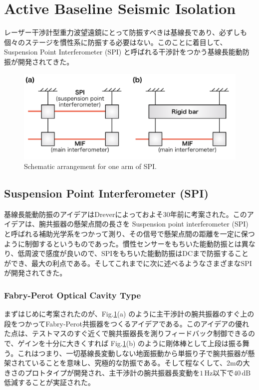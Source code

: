 \section{Active Baseline Seismic Isolation}
レーザー干渉計型重力波望遠鏡にとって防振すべきは基線長であり、必ずしも個々のステージを慣性系に防振する必要はない。このことに着目して、Suspension Point Interferometer (SPI) と呼ばれる干渉計をつかう基線長能動防振が開発されてきた。

\begin{figure}[H]
  \begin{center}   
    \includegraphics[width=13cm]{./img_chap5/img508.png}
    \caption{Schematic arrangement for one arm of SPI.} \label{img:img508}
  \end{center}
\end{figure}
\subsection{Suspension Point Interferometer (SPI)}
基線長能動防振のアイデアはDreverによっておよそ30年前に考案された。このアイデアは、腕共振器の懸架点間の長さを Suspension point interferometer (SPI) と呼ばれる補助光学系をつかって測り、その信号で懸架点間の距離を一定に保つように制御するというものであった\cite{drever1987outline}。慣性センサーをもちいた能動防振とは異なり、低周波で感度が良いので、SPIをもちいた能動防振はDCまで防振することができ、最大の利点である。そしてこれまでに次に述べるようなさまざまなSPIが開発されてきた。

\subsubsection{Fabry-Perot Optical Cavity Type }
まずはじめに考案されたのが、Fig.\ref{img:img508}(a) のように主干渉計の腕共振器のすぐ上の段をつかってFabry-Perot共振器をつくるアイデアである\cite{drever2002extension}。このアイデアの優れた点は、テストマスのすぐ近くで腕共振器長を測りフィードバック制御できるので、ゲインを十分に大きくすれば Fig.\ref{img:img508}(b) のように剛体棒として上段は振る舞う。これはつまり、一切基線長変動しない地面振動から単振り子で腕共振器が懸架されていることを意味し、究極的な防振である。そして程なくして、2mの大きさのプロトタイプが開発され、主干渉計の腕共振器長変動を$1\,\mathrm{Hz}$以下で$40\,\mathrm{dB}$低減することが実証された\cite{aso2004stabilization}。

